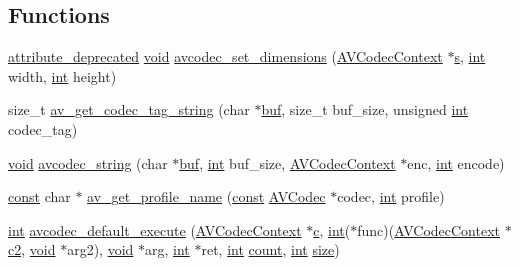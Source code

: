 \subsection*{Functions}
\begin{DoxyCompactItemize}
\item 
\hyperlink{attributes_8h_aa6d076561d3a9eea4729ee632652de02}{attribute\+\_\+deprecated} \hyperlink{sound_8c_ae35f5844602719cf66324f4de2a658b3}{void} \hyperlink{group__lavc__misc_ga4e17541c4f237465b50668d279192da8}{avcodec\+\_\+set\+\_\+dimensions} (\hyperlink{struct_a_v_codec_context}{A\+V\+Codec\+Context} $\ast$\hyperlink{lib_2expat_8h_a755339d27872b13735c2cab829e47157}{s}, \hyperlink{xmltok_8h_a5a0d4a5641ce434f1d23533f2b2e6653}{int} width, \hyperlink{xmltok_8h_a5a0d4a5641ce434f1d23533f2b2e6653}{int} height)
\item 
size\+\_\+t \hyperlink{group__lavc__misc_ga1f9e278e427564ee2e8b0ad875dbe5df}{av\+\_\+get\+\_\+codec\+\_\+tag\+\_\+string} (char $\ast$\hyperlink{xlstr_8c_a781718f5b53a876fe91c424c4607fa8f}{buf}, size\+\_\+t buf\+\_\+size, unsigned \hyperlink{xmltok_8h_a5a0d4a5641ce434f1d23533f2b2e6653}{int} codec\+\_\+tag)
\item 
\hyperlink{sound_8c_ae35f5844602719cf66324f4de2a658b3}{void} \hyperlink{group__lavc__misc_ga6d4056568b5ab73d2e55800d9a5caa66}{avcodec\+\_\+string} (char $\ast$\hyperlink{xlstr_8c_a781718f5b53a876fe91c424c4607fa8f}{buf}, \hyperlink{xmltok_8h_a5a0d4a5641ce434f1d23533f2b2e6653}{int} buf\+\_\+size, \hyperlink{struct_a_v_codec_context}{A\+V\+Codec\+Context} $\ast$enc, \hyperlink{xmltok_8h_a5a0d4a5641ce434f1d23533f2b2e6653}{int} encode)
\item 
\hyperlink{getopt1_8c_a2c212835823e3c54a8ab6d95c652660e}{const} char $\ast$ \hyperlink{group__lavc__misc_ga0dc4a8003d0818a235bde2d8fbe81e11}{av\+\_\+get\+\_\+profile\+\_\+name} (\hyperlink{getopt1_8c_a2c212835823e3c54a8ab6d95c652660e}{const} \hyperlink{struct_a_v_codec}{A\+V\+Codec} $\ast$codec, \hyperlink{xmltok_8h_a5a0d4a5641ce434f1d23533f2b2e6653}{int} profile)
\item 
\hyperlink{xmltok_8h_a5a0d4a5641ce434f1d23533f2b2e6653}{int} \hyperlink{group__lavc__misc_ga9ccd730ba6e891b6c61da68ab138c63f}{avcodec\+\_\+default\+\_\+execute} (\hyperlink{struct_a_v_codec_context}{A\+V\+Codec\+Context} $\ast$\hyperlink{rfft2d_test_m_l_8m_ae0323a9039add2978bf5b49550572c7c}{c}, \hyperlink{xmltok_8h_a5a0d4a5641ce434f1d23533f2b2e6653}{int}($\ast$func)(\hyperlink{struct_a_v_codec_context}{A\+V\+Codec\+Context} $\ast$\hyperlink{convtest_8m_a09ab2f3b6c61c793c7b6d24912b2cea0}{c2}, \hyperlink{sound_8c_ae35f5844602719cf66324f4de2a658b3}{void} $\ast$arg2), \hyperlink{sound_8c_ae35f5844602719cf66324f4de2a658b3}{void} $\ast$arg, \hyperlink{xmltok_8h_a5a0d4a5641ce434f1d23533f2b2e6653}{int} $\ast$ret, \hyperlink{xmltok_8h_a5a0d4a5641ce434f1d23533f2b2e6653}{int} \hyperlink{metrics_8c_afea6e77db19a2f8c91419904fe665a3a}{count}, \hyperlink{xmltok_8h_a5a0d4a5641ce434f1d23533f2b2e6653}{int} \hyperlink{group__lavu__mem_ga854352f53b148adc24983a58a1866d66}{size})

\end{DoxyCompactItemize}
